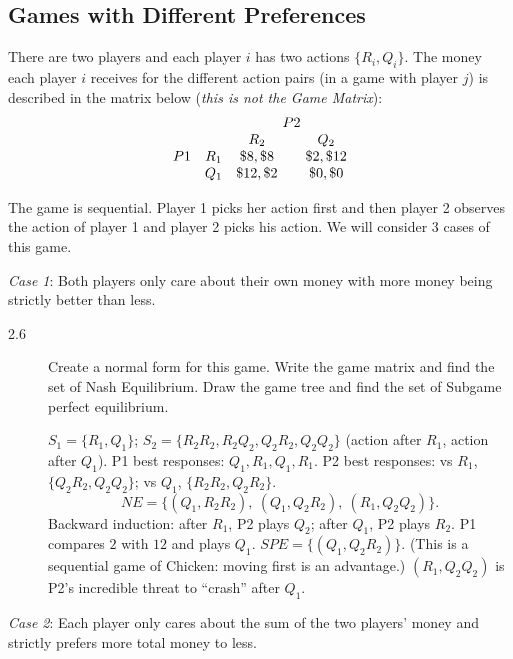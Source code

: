 \subsection{Games with Different Preferences}

\noindent There are two players and each player $i$ has two actions $\{R_i,Q_i\}$. The money each player $i$ receives for the different action pairs (in a game with player $j$) is described in the matrix below (\emph{this is not the Game Matrix}):
\[
\begin{array}{ccc@{\qquad}c}
 & & \multicolumn{2}{c}{P2}\\
 & & R_2 & Q_2\\
P1 & R_1 & \$8,\$8 & \$2,\$12\\
 & Q_1 & \$12,\$2 & \$0,\$0
\end{array}
\]

The game is sequential. Player 1 picks her action first and then player 2 observes the action of player 1 and player 2 picks his action. We will consider 3 cases of this game.

\emph{Case 1}: Both players only care about their own money with more money being strictly better than less.

\begin{description}
\item[2.6] Create a normal form for this game. Write the game matrix and find the set of Nash Equilibrium. Draw the game tree and find the set of Subgame perfect equilibrium.
\begin{solution}
$S_1=\{R_1,Q_1\}$; $S_2=\{R_2R_2,R_2Q_2,Q_2R_2,Q_2Q_2\}$ (action after $R_1$, action after $Q_1$).
P1 best responses: $Q_1,R_1,Q_1,R_1$. P2 best responses: vs $R_1$, $\{Q_2R_2,Q_2Q_2\}$; vs $Q_1$, $\{R_2R_2,Q_2R_2\}$.
\[NE=\{(Q_1,R_2R_2),\ (Q_1,Q_2R_2),\ (R_1,Q_2Q_2)\}.\]
Backward induction: after $R_1$, P2 plays $Q_2$; after $Q_1$, P2 plays $R_2$. P1 compares $2$ with $12$ and plays $Q_1$. $SPE=\{(Q_1,Q_2R_2)\}$. (This is a sequential game of Chicken: moving first is an advantage.) $(R_1,Q_2Q_2)$ is P2's incredible threat to ``crash'' after $Q_1$.
\end{solution}
\end{description}

\emph{Case 2}: Each player only cares about the sum of the two players' money and strictly prefers more total money to less.

